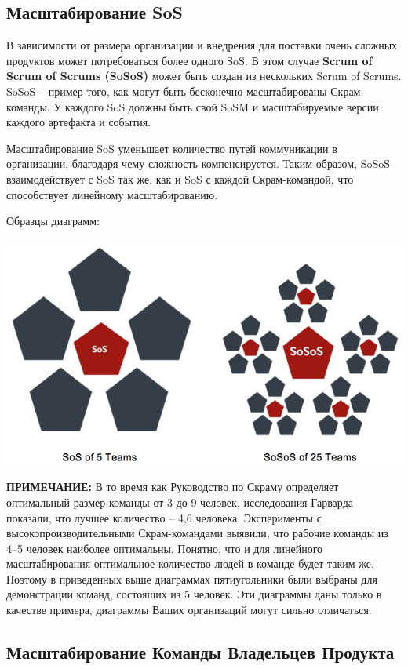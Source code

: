\documentclass[12pt,a4paper,parskip=full]{scrartcl}
\begin{document}
\subsection{Масштабирование SoS}

В зависимости от размера организации и внедрения для поставки очень сложных продуктов может потребоваться более одного SoS. В этом случае \textbf{Scrum of Scrum of Scrums (SoSoS)} может быть создан из нескольких Scrum of Scrums. SoSoS – пример того, как могут быть бесконечно масштабированы Скрам-команды. У каждого SoS должны быть свой SoSM и масштабируемые версии каждого артефакта и события. 

Масштабирование SoS уменьшает количество путей коммуникации в организации, благодаря чему сложность компенсируется. Таким образом, SoSoS взаимодействует с SoS так же, как и SoS с каждой Скрам-командой, что способствует линейному масштабированию.

Образцы диаграмм:

\includegraphics[width=1.0\linewidth]{Sos-R2.png}

\textbf{\textsc{ПРИМЕЧАНИЕ:}} В то время как Руководство по Скраму определяет оптимальный размер команды от 3 до 9 человек, исследования Гарварда показали, что лучшее количество – 4,6 человека. Эксперименты с высокопроизводительными Скрам-командами выявили, что рабочие команды из 4–5 человек наиболее оптимальны. Понятно, что и для линейного масштабирования оптимальное количество людей в команде будет таким же. Поэтому в приведенных выше диаграммах пятиугольники были выбраны для демонстрации команд, состоящих из 5 человек. 
Эти диаграммы даны только в качестве примера, диаграммы Ваших организаций могут сильно отличаться. 


\subsection{Масштабирование Команды Владельцев Продукта}
\end{document}
